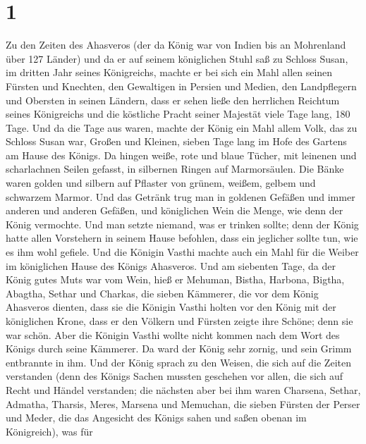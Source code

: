 \hypertarget{section}{%
\section{1}\label{section}}

 Zu den Zeiten des Ahasveros (der da König war von Indien
bis an Mohrenland über 127 Länder)  und da er auf seinem
königlichen Stuhl saß zu Schloss Susan,  im dritten Jahr
seines Königreichs, machte er bei sich ein Mahl allen seinen Fürsten und
Knechten, den Gewaltigen in Persien und Medien, den Landpflegern und
Obersten in seinen Ländern,  dass er sehen ließe den
herrlichen Reichtum seines Königreichs und die köstliche Pracht seiner
Majestät viele Tage lang, 180 Tage.  Und da die Tage aus
waren, machte der König ein Mahl allem Volk, das zu Schloss Susan war,
Großen und Kleinen, sieben Tage lang im Hofe des Gartens am Hause des
Königs.  Da hingen weiße, rote und blaue Tücher, mit
leinenen und scharlachnen Seilen gefasst, in silbernen Ringen auf
Marmorsäulen. Die Bänke waren golden und silbern auf Pflaster von
grünem, weißem, gelbem und schwarzem Marmor.  Und das
Getränk trug man in goldenen Gefäßen und immer anderen und anderen
Gefäßen, und königlichen Wein die Menge, wie denn der König vermochte.
 Und man setzte niemand, was er trinken sollte; denn der
König hatte allen Vorstehern in seinem Hause befohlen, dass ein
jeglicher sollte tun, wie es ihm wohl gefiele.  Und die
Königin Vasthi machte auch ein Mahl für die Weiber im königlichen Hause
des Königs Ahasveros.  Und am siebenten Tage, da der König
gutes Muts war vom Wein, hieß er Mehuman, Bistha, Harbona, Bigtha,
Abagtha, Sethar und Charkas, die sieben Kämmerer, die vor dem König
Ahasveros dienten,  dass sie die Königin Vasthi holten vor
den König mit der königlichen Krone, dass er den Völkern und Fürsten
zeigte ihre Schöne; denn sie war schön.  Aber die Königin
Vasthi wollte nicht kommen nach dem Wort des Königs durch seine
Kämmerer. Da ward der König sehr zornig, und sein Grimm entbrannte in
ihm.  Und der König sprach zu den Weisen, die sich auf die
Zeiten verstanden (denn des Königs Sachen mussten geschehen vor allen,
die sich auf Recht und Händel verstanden;  die nächsten
aber bei ihm waren Charsena, Sethar, Admatha, Tharsis, Meres, Marsena
und Memuchan, die sieben Fürsten der Perser und Meder, die das Angesicht
des Königs sahen und saßen obenan im Königreich),  was für
